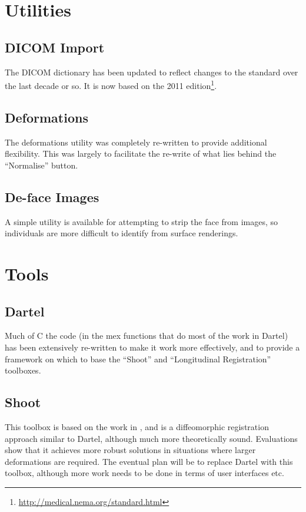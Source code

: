 \documentclass[a4paper,titlepage,openany]{article}
\begin{document}
\section{Utilities}

\subsection{DICOM Import}
The DICOM dictionary has been updated to reflect changes to the standard over the last decade or so.
It is now based on the 2011 edition\footnote{\url{http://medical.nema.org/standard.html}}.

\subsection{Deformations}
The deformations utility was completely re-written to provide additional flexibility.
This was largely to facilitate the re-write of what lies behind the ``Normalise'' button.

\subsection{De-face Images}
A simple utility is available for attempting to strip the face from images, so individuals are more difficult to identify from surface renderings.

\section{Tools}

\subsection{Dartel}
Much of C the code (in the mex functions that do most of the work in Dartel) has been extensively re-written to make it work more effectively, and to provide a framework on which to base the ``Shoot'' and ``Longitudinal Registration'' toolboxes.

\subsection{Shoot}
This toolbox is based on the work in \cite{ashburner2011diffeomorphic}, and is a diffeomorphic registration approach similar to Dartel, although much more theoretically sound.
Evaluations show that it achieves more robust solutions in situations where larger deformations are required.
The eventual plan will be to replace Dartel with this toolbox, although more work needs to be done in terms of user interfaces etc.
\end{document}
